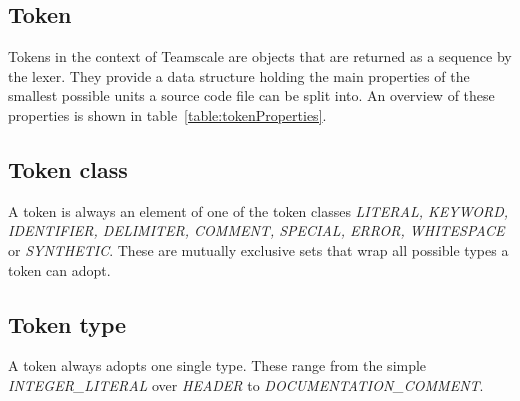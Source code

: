 \subsection{Token}
\label{section:token}
Tokens in the context of Teamscale are objects that are returned as a sequence by the lexer. They provide a data structure holding the main properties of the smallest possible units a source code file can be split into. An overview of these properties is shown in table~\ref{table:tokenProperties}.


\subsection{Token class}
A token is always an element of one of the token classes \textit{LITERAL, KEYWORD, IDENTIFIER, DELIMITER, COMMENT, SPECIAL, ERROR, WHITESPACE} or \textit{SYNTHETIC}. These are mutually exclusive sets that wrap all possible types a token can adopt.

\subsection{Token type}
A token always adopts one single type. These range from the simple \textit{INTEGER\_LITERAL} over \textit{HEADER} to \textit{DOCUMENTATION\_COMMENT}.
